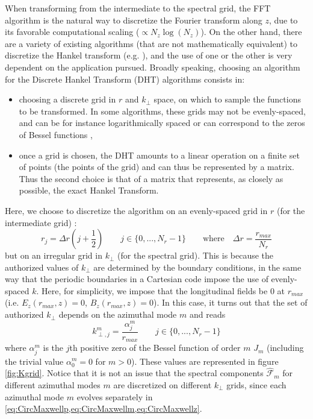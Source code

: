 \documentclass[1p,times,authoryear]{elsarticle}
\newcommand{\spectral}[1]{\hat{\mathcal{#1}}}
\begin{document}
When transforming from the intermediate to the spectral grid, the FFT
algorithm is the natural way to discretize the Fourier transform along $z$, due to its
favorable computational scaling ($\propto N_z\log(N_z)$).
On the other hand, there are a variety of existing algorithms (that are not mathematically
equivalent) to discretize the Hankel
transform (e.g. \citep{Cree,Yu,Siegman,Guizar,KaiMing}), and the use of one or the other
is very dependent on the application pursued. Broadly
speaking, choosing an algorithm for the Discrete Hankel Transform (DHT)
algorithms consists in:
\begin{itemize}
\item choosing a discrete grid in $r$ and $k_\perp$ space, on which to
  sample the functions to be transformed. In some algorithms, these
  grids may not be evenly-spaced, and can be for instance
  logarithmically spaced \citep{Siegman} or can correspond to the zeros of
  Bessel functions \citep{Yu,Guizar,KaiMing},
\item once a grid is chosen, the DHT amounts to a linear operation on a
  finite set of points (the points of the grid) and can thus be
  represented by a matrix. Thus the second choice is that of a matrix
  that represents, as closely as possible, the exact Hankel Transform.
\end{itemize}
Here, we choose to discretize the algorithm on an evenly-spaced grid in $r$
(for the intermediate grid) :
\[ r_j = \Delta r \left( j+\frac{1}{2} \right) \qquad  j \in \{0, ...,
N_r-1 \} \qquad \mathrm{where} \quad \Delta r = \frac{r_{max}}{N_r} \]
but on an irregular grid in $k_\perp$ (for the spectral grid). This is because the authorized
values of $k_\perp$ are determined by the boundary conditions, in the same way that
the periodic boundaries in a Cartesian code impose the use of
evenly-spaced $k$. Here, for simplicity, we impose that the
longitudinal fields be $0$ at $r_{max}$ (i.e. $E_z(r_{max}, z) = 0$,
$B_z(r_{max}, z) = 0$). In this case, it turns out that the set of authorized
$k_\perp$ depends on the azimuthal mode $m$ and reads
\[  k^m_{\perp,j} = \frac{\alpha_j^m}{r_{max}} \qquad j \in \{0, ..., N_r-1 \}\]
where $\alpha^m_j$ is the $j$th positive zero of the Bessel function of order
$m$ $J_m$ (including the trivial value $\alpha_0^m=0$ for
$m>0$). These values are represented in figure \ref{fig:Kgrid}. Notice
that it is not an issue that the spectral components $\spectral{F}_m$
for different azimuthal modes $m$ are discretized on different
$k_\perp$ grids, since each azimuthal mode $m$ evolves separately in
\cref{eq:CircMaxwellp,eq:CircMaxwellm,eq:CircMaxwellz}.
\end{document}
